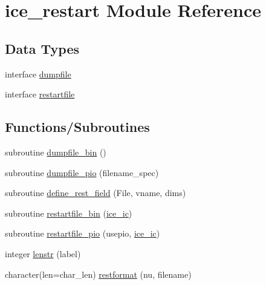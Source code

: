 \hypertarget{namespaceice__restart}{
\section{ice\_\-restart Module Reference}
\label{namespaceice__restart}
}
\subsection*{Data Types}
\begin{DoxyCompactItemize}
\item 
interface \hyperlink{interfaceice__restart_1_1dumpfile}{dumpfile}
\item 
interface \hyperlink{interfaceice__restart_1_1restartfile}{restartfile}
\end{DoxyCompactItemize}
\subsection*{Functions/Subroutines}
\begin{DoxyCompactItemize}
\item 
subroutine \hyperlink{namespaceice__restart_af23e2fba277975028e2c7793dc27af3d}{dumpfile\_\-bin} ()
\item 
subroutine \hyperlink{namespaceice__restart_a6e7b7e169c2a300f73a29cbe37f22219}{dumpfile\_\-pio} (filename\_\-spec)
\item 
subroutine \hyperlink{namespaceice__restart_aa51583c33942714cd58c05544b96a5bd}{define\_\-rest\_\-field} (File, vname, dims)
\item 
subroutine \hyperlink{namespaceice__restart_ad32165edb70403f5261f5d7e4f91e0ec}{restartfile\_\-bin} (\hyperlink{namespaceice__restart_a7b5bbbfe819de3da4a61882a1c69631d}{ice\_\-ic})
\item 
subroutine \hyperlink{namespaceice__restart_ab42c7fd99429cb9ca5ec096c45840c08}{restartfile\_\-pio} (usepio, \hyperlink{namespaceice__restart_a7b5bbbfe819de3da4a61882a1c69631d}{ice\_\-ic})
\item 
integer \hyperlink{namespaceice__restart_affff786ae56a7f09bc01c31d71a1333c}{lenstr} (label)
\item 
character(len=char\_\-len) \hyperlink{namespaceice__restart_aba88448e14afbb601cdae9f2c86b6943}{restformat} (nu, filename)
\end{DoxyCompactItemize}
